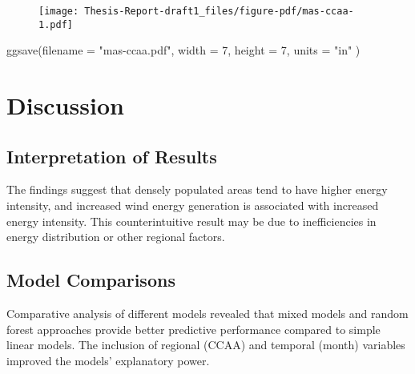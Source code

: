 \documentclass[
]{report}
\newenvironment{Shaded}{\begin{snugshade}}{\end{snugshade}}
\newcommand{\AttributeTok}[1]{\textcolor[rgb]{0.40,0.45,0.13}{#1}}
\newcommand{\DecValTok}[1]{\textcolor[rgb]{0.68,0.00,0.00}{#1}}
\newcommand{\FunctionTok}[1]{\textcolor[rgb]{0.28,0.35,0.67}{#1}}
\newcommand{\NormalTok}[1]{\textcolor[rgb]{0.00,0.23,0.31}{#1}}
\newcommand{\StringTok}[1]{\textcolor[rgb]{0.13,0.47,0.30}{#1}}
\begin{document}
\begin{figure}[H]

{\centering \texttt{[image: Thesis-Report-draft1\_files/figure-pdf/mas-ccaa-1.pdf]}

}

\end{figure}

\begin{Shaded}
\begin{Highlighting}[]
\FunctionTok{ggsave}\NormalTok{(}\AttributeTok{filename =} \StringTok{"mas{-}ccaa.pdf"}\NormalTok{, }\AttributeTok{width =} \DecValTok{7}\NormalTok{, }\AttributeTok{height =} \DecValTok{7}\NormalTok{, }\AttributeTok{units =} \StringTok{"in"}\NormalTok{ )}
\end{Highlighting}
\end{Shaded}

\hypertarget{discussion}{%
\chapter{Discussion}\label{discussion}}

\hypertarget{interpretation-of-results}{%
\section{Interpretation of Results}\label{interpretation-of-results}}

The findings suggest that densely populated areas tend to have higher
energy intensity, and increased wind energy generation is associated
with increased energy intensity. This counterintuitive result may be due
to inefficiencies in energy distribution or other regional factors.

\hypertarget{model-comparisons}{%
\section{Model Comparisons}\label{model-comparisons}}

Comparative analysis of different models revealed that mixed models and
random forest approaches provide better predictive performance compared
to simple linear models. The inclusion of regional (CCAA) and temporal
(month) variables improved the models' explanatory power.
\end{document}
